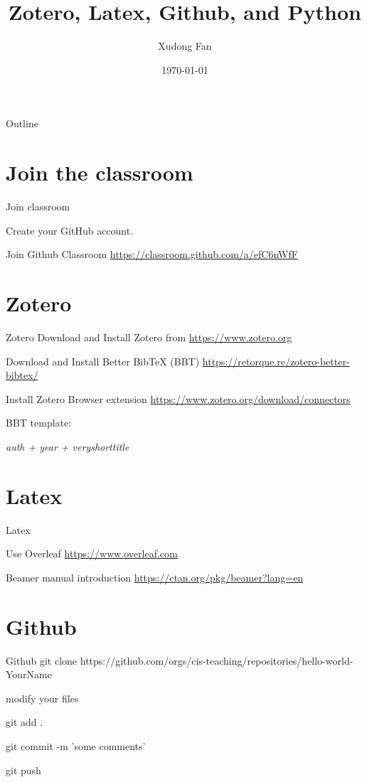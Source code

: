 \documentclass{beamer}
\title{Zotero, Latex, Github, and Python}
\author{Xudong Fan}
\date{\today}
\begin{document}
\begin{frame}
    \titlepage
\end{frame}

\logo{}


\begin{frame}{Outline}
    \tableofcontents
\end{frame}

\section{Join the classroom}
\begin{frame}{Join classroom}

    Create your GitHub account.

    Join Github Classroom \url{https://classroom.github.com/a/efC6nWfF}

\end{frame}

\section{Zotero}
\begin{frame}{Zotero}
    Download and Install Zotero from \url{https://www.zotero.org}

    Download and Install Better BibTeX (BBT) \url{https://retorque.re/zotero-better-bibtex/}

    Install Zotero Browser extension \url{https://www.zotero.org/download/connectors}

    BBT template:

    \em{auth + year + veryshorttitle}

\end{frame}

\section{Latex}
\begin{frame}{Latex}

    Use Overleaf \url{https://www.overleaf.com}

    Beamer manual introduction \url{https://ctan.org/pkg/beamer?lang=en}

\end{frame}

\section{Github}
\begin{frame}{Github}
    git clone {https://github.com/orgs/cis-teaching/repositories/hello-world-YourName}

    modify your files

    git add .

    git commit -m 'some comments'

    git push
\end{frame}
\end{document}
